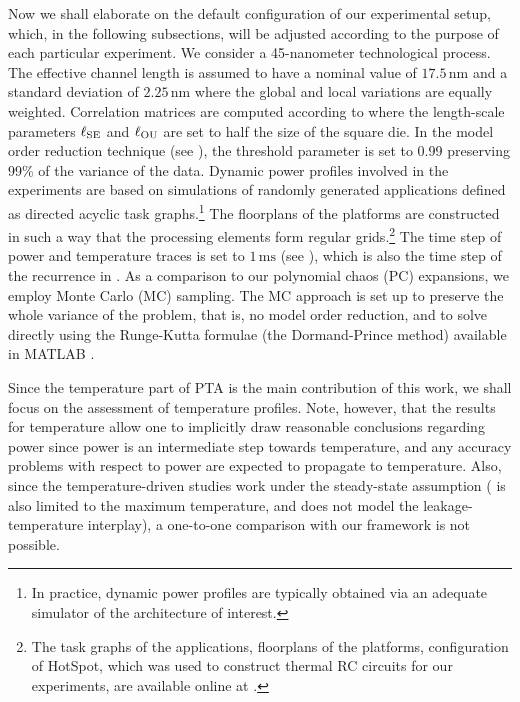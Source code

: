 Now we shall elaborate on the default configuration of our experimental setup,
which, in the following subsections, will be adjusted according to the purpose
of each particular experiment. We consider a 45-nanometer technological process.
The effective channel length is assumed to have a nominal value of
$17.5\,\text{nm}$ \cite{ptm} and a standard deviation of $2.25\,\text{nm}$ where
the global and local variations are equally weighted. Correlation matrices are
computed according to  where the length-scale
parameters $\ell_{\mathrm{SE}}$ and $\ell_{\mathrm{OU}}$ are set to half the size of the square die.
In the model order reduction technique (see ), the
threshold parameter is set to 0.99 preserving 99\% of the variance of the data.
Dynamic power profiles involved in the experiments are based on simulations of
randomly generated applications defined as directed acyclic task
graphs.\footnote{In practice, dynamic power profiles are typically obtained via
an adequate simulator of the architecture of interest.} The floorplans of the
platforms are constructed in such a way that the processing elements form
regular grids.\footnote{The task graphs of the applications, floorplans of the
platforms, configuration of HotSpot, which was used to construct thermal RC
circuits for our experiments, are available online at \cite{eslab2014}.} The
time step of power and temperature traces is set to $1\,\text{ms}$ (see
), which is also the time step of the recurrence in
. As a comparison to our polynomial chaos (PC) expansions,
we employ Monte Carlo (MC) sampling. The MC approach is set up to preserve the
whole variance of the problem, that is, no model order reduction, and to solve
 directly using the Runge-Kutta formulae (the
Dormand-Prince method) available in MATLAB \cite{matlab}.

Since the temperature part of PTA is the main contribution of this work, we
shall focus on the assessment of temperature profiles. Note, however, that the
results for temperature allow one to implicitly draw reasonable conclusions
regarding power since power is an intermediate step towards temperature, and any
accuracy problems with respect to power are expected to propagate to
temperature. Also, since the temperature-driven studies \cite{juan2011,
juan2012, huang2009a, lee2013} work under the steady-state assumption
(\cite{juan2011} is also limited to the maximum temperature, and
\cite{huang2009a} does not model the leakage-temperature interplay), a
one-to-one comparison with our framework is not possible.

